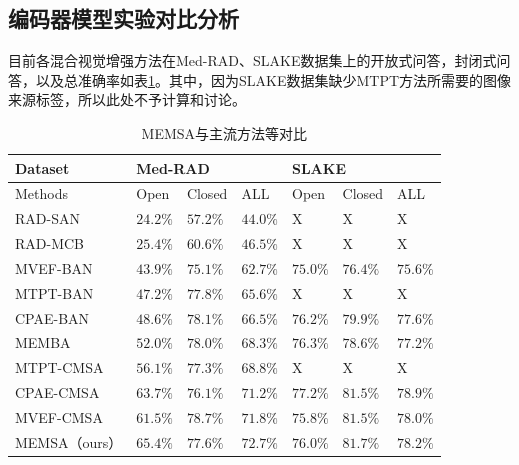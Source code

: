 \subsection{编码器模型实验对比分析}
目前各混合视觉增强方法在Med-RAD、SLAKE数据集上的开放式问答，封闭式问答，以及总准确率如表\ref{tab:modal_red_cmp1}。其中，因为SLAKE数据集缺少MTPT方法所需要的图像来源标签，所以此处不予计算和讨论。
\begin{table}
	\caption{\label{tab:modal_red_cmp1}MEMSA与主流方法等对比}
	\centering
	\small
	\begin{tabular}{l|lll|lll}
		\hline Dataset & \multicolumn{3}{l}{\textbf{Med-RAD}} & \multicolumn{3}{|l}{\textbf{SLAKE}} \\ 
		\hline Methods & Open & Closed & ALL & Open & Closed & ALL\\
		\hline RAD-SAN\cite{lau2018dataset} & $24.2 \%$ & $57.2 \%$ & $44.0 \%$ & X & X & X\\
		RAD-MCB\cite{lau2018dataset} & $25.4 \%$ & $60.6 \%$ & $46.5 \%$ & X & X & X\\
		\hline MVEF-BAN \cite{nguyen2019overcoming} & $43.9 \%$ & $75.1 \%$ & $62.7 \%$ & $75.0 \%$ & $76.4 \%$ & $75.6 \%$ \\
		MTPT-BAN & $47.2 \%$ & $77.8 \%$ & $65.6 \%$ & X & X & X\\
		CPAE-BAN\cite{eslami2021does} & $48.6 \%$ & $78.1 \%$ & $66.5 \%$ & $76.2 \%$ & $79.9 \%$ & $77.6 \%$\\
		MEMBA & $52.0 \%$ & $78.0 \%$ & $68.3 \%$ & $76.3 \%$ & $78.6 \%$ & $77.2 \%$\\
		\hline MTPT-CMSA\cite{gong2021cross} & $56.1 \%$ & $77.3 \%$ & $68.8 \%$ & X & X & X\\
		CPAE-CMSA & $63.7 \%$ & $76.1 \%$ & $71.2 \%$ & $77.2 \%$ & $81.5 \%$ & $78.9 \%$\\
		MVEF-CMSA & $61.5 \%$ & $78.7 \%$ & $71.8 \%$ & $75.8 \%$ & $81.5 \%$ & $78.0 \%$\\
		MEMSA（ours） & $\mathbf{65.4 \%}$ & $77.6 \%$ & $\mathbf{72.7 \%}$ & $76.0 \%$ & $\mathbf{81.7 \%}$ & $78.2 \%$\\
		\hline
		\end{tabular}
\end{table}

